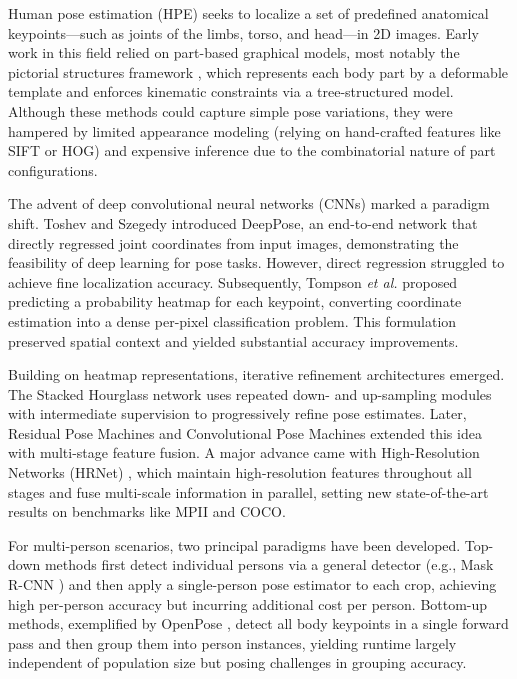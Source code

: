 Human pose estimation (HPE) seeks to localize a set of predefined anatomical keypoints—such as joints of the limbs, torso, and head—in 2D images. Early work in this field relied on part-based graphical models, most notably the pictorial structures framework \citep{Felzenszwalb2005}, which represents each body part by a deformable template and enforces kinematic constraints via a tree-structured model. Although these methods could capture simple pose variations, they were hampered by limited appearance modeling (relying on hand-crafted features like SIFT or HOG) and expensive inference due to the combinatorial nature of part configurations.

The advent of deep convolutional neural networks (CNNs) marked a paradigm shift. Toshev and Szegedy \citep{Toshev2014DeepPose} introduced DeepPose, an end-to-end network that directly regressed joint coordinates from input images, demonstrating the feasibility of deep learning for pose tasks. However, direct regression struggled to achieve fine localization accuracy. Subsequently, Tompson \emph{et al.} \citep{Tompson2015} proposed predicting a probability heatmap for each keypoint, converting coordinate estimation into a dense per-pixel classification problem. This formulation preserved spatial context and yielded substantial accuracy improvements.

Building on heatmap representations, iterative refinement architectures emerged. The Stacked Hourglass network \citep{Newell2016} uses repeated down- and up-sampling modules with intermediate supervision to progressively refine pose estimates. Later, Residual Pose Machines and Convolutional Pose Machines extended this idea with multi-stage feature fusion. A major advance came with High-Resolution Networks (HRNet) \citep{Sun_2019_CVPR}, which maintain high-resolution features throughout all stages and fuse multi-scale information in parallel, setting new state-of-the-art results on benchmarks like MPII and COCO.

For multi-person scenarios, two principal paradigms have been developed. Top-down methods first detect individual persons via a general detector (e.g., Mask R-CNN \citep{He2017}) and then apply a single-person pose estimator to each crop, achieving high per-person accuracy but incurring additional cost per person. Bottom-up methods, exemplified by OpenPose \citep{Cao_2017_CVPR}, detect all body keypoints in a single forward pass and then group them into person instances, yielding runtime largely independent of population size but posing challenges in grouping accuracy.

